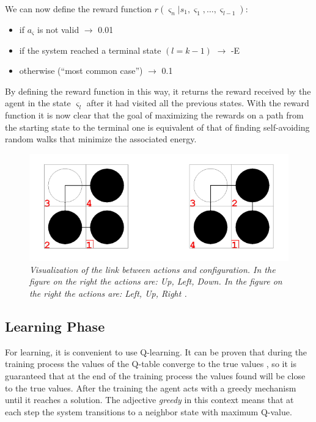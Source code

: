 We can now define the reward function $r(\varsigma_{n}|s_{1}, \varsigma_{1}, \ldots, \varsigma_{l-1})$:
\begin{itemize}
    \item if $a_{\varsigma}$ is not valid $\rightarrow$ 0.01
    \item if the system reached a terminal state $(l = k-1)$ $\rightarrow$ -E
    \item otherwise (``most common case'') $\rightarrow$ 0.1
\end{itemize}
By defining the reward function in this way, it returns the reward received by the agent in the state $\varsigma_{l}$ after it had visited all the previous states.
With the reward function it is now clear that the goal of maximizing the rewards on a path from the starting state to the terminal one is equivalent of that of finding self-avoiding random walks that minimize the associated energy.

\begin{figure}[H]
    \centering
    \includegraphics[width=.75\textwidth]{img/rl1.png}
    \caption{\emph{Visualization of the link between actions and configuration. In the figure on the right the actions are: Up, Left, Down. In the figure on the right the actions are: Left, Up, Right \cite{czibula2011reinforcement}.}}
    \label{fig:rl1}
\end{figure}
\subsection{Learning Phase}

For learning, it is convenient to use Q-learning.
It can be proven that during the training process the values of the Q-table converge to the true values \cite{czibula2011reinforcement}, so it is guaranteed that at the end of the training process the values found will be close to the true values.
After the training the agent acts with a greedy mechanism until it reaches a solution.
The adjective \emph{greedy} in this context means that at each step the system transitions to a neighbor state with maximum Q-value.

